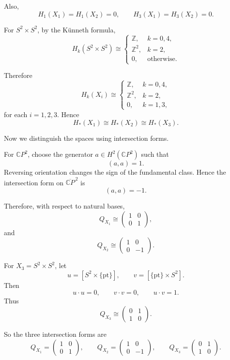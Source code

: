 \documentclass[12pt,a4paper]{article}
\theoremstyle{notespace}
\begin{document}
Also,
\[
H_1(X_1)=H_1(X_2)=0,
\qquad
H_3(X_1)=H_3(X_2)=0.
\]

For \(S^2\times S^2\), by the Künneth formula,
\[
H_k(S^2\times S^2)\cong
\begin{cases}
	\mathbb Z, & k=0,4,\\
	\mathbb Z^2, & k=2,\\
	0, & \text{otherwise}.
\end{cases}
\]

Therefore
\[
H_k(X_i)\cong
\begin{cases}
	\mathbb Z, & k=0,4,\\
	\mathbb Z^2, & k=2,\\
	0, & k=1,3,
\end{cases}
\]
for each \(i=1,2,3\). Hence
\[
H_*(X_1)\cong H_*(X_2)\cong H_*(X_3).
\]

Now we distinguish the spaces using intersection forms.

For \(\mathbb CP^2\), choose the generator \(a\in H^2(\mathbb CP^2)\) such that
\[
(a,a)=1.
\]
Reversing orientation changes the sign of the fundamental class. Hence the
intersection form on \(\overline{\mathbb CP}^{\,2}\) is
\[
(a,a)=-1.
\]

Therefore, with respect to natural bases,
\[
Q_{X_1}\cong
\begin{pmatrix}
	1 & 0\\
	0 & 1
\end{pmatrix},
\]
and
\[
Q_{X_2}\cong
\begin{pmatrix}
	1 & 0\\
	0 & -1
\end{pmatrix}.
\]

For \(X_3=S^2\times S^2\), let
\[
u=[S^2\times \{\mathrm{pt}\}],
\qquad
v=[\{\mathrm{pt}\}\times S^2].
\]
Then
\[
u\cdot u=0,
\qquad
v\cdot v=0,
\qquad
u\cdot v=1.
\]
Thus
\[
Q_{X_3}\cong
\begin{pmatrix}
	0 & 1\\
	1 & 0
\end{pmatrix}.
\]

So the three intersection forms are
\[
Q_{X_1}=
\begin{pmatrix}
	1 & 0\\
	0 & 1
\end{pmatrix},
\qquad
Q_{X_2}=
\begin{pmatrix}
	1 & 0\\
	0 & -1
\end{pmatrix},
\qquad
Q_{X_3}=
\begin{pmatrix}
	0 & 1\\
	1 & 0
\end{pmatrix}.
\]
\end{document}
